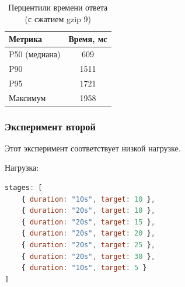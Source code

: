 \documentclass[12pt]{article}
\begin{document}
\begin{table}[H]
    \centering
    \caption{Перцентили времени ответа (с сжатием gzip 9)}
    \begin{tabular}{lS[table-format=4.5]}
        \toprule
        \textbf{Метрика} & \textbf{Время, мс} \\
        \midrule
        P50 (медиана)    & 609                \\
        P90              & 1511               \\
        P95              & 1721               \\
        Максимум         & 1958               \\
        \bottomrule
    \end{tabular}
\end{table}

\subsubsection{Эксперимент второй}

Этот эксперимент соответствует низкой нагрузке.

Нагрузка:
\begin{lstlisting}[language=JavaScript]
stages: [
    { duration: "10s", target: 10 },
    { duration: "20s", target: 10 },
    { duration: "20s", target: 15 },
    { duration: "20s", target: 20 },
    { duration: "20s", target: 25 },
    { duration: "20s", target: 30 },
    { duration: "10s", target: 5 }
]
\end{lstlisting}
\end{document}
